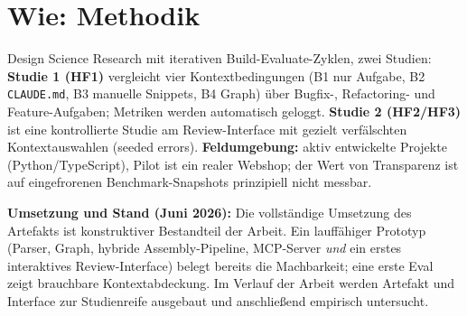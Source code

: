 \documentclass[11pt,a4paper]{scrartcl}
\newcommand{\code}[1]{\texttt{#1}}
\begin{document}
\section{Wie: Methodik}

Design Science Research mit iterativen Build-Evaluate-Zyklen, zwei Studien:
\textbf{Studie 1 (HF1)} vergleicht vier Kontextbedingungen (B1 nur Aufgabe, B2 \code{CLAUDE.md},
B3 manuelle Snippets, B4 Graph) über Bugfix-, Refactoring- und Feature-Aufgaben; Metriken werden
automatisch geloggt. \textbf{Studie 2 (HF2/HF3)} ist eine kontrollierte Studie am Review-Interface
mit gezielt verfälschten Kontextauswahlen (seeded errors). \textbf{Feldumgebung:} aktiv
entwickelte Projekte (Python/TypeScript), Pilot ist ein realer Webshop; der Wert von
Transparenz ist auf eingefrorenen Benchmark-Snapshots prinzipiell nicht messbar.

\textbf{Umsetzung und Stand (Juni 2026):} Die vollständige Umsetzung des Artefakts ist
konstruktiver Bestandteil der Arbeit. Ein lauffähiger Prototyp (Parser, Graph, hybride
Assembly-Pipeline, MCP-Server \emph{und} ein erstes interaktives Review-Interface) belegt
bereits die Machbarkeit; eine erste Eval zeigt brauchbare Kontextabdeckung. Im Verlauf der
Arbeit werden Artefakt und Interface zur Studienreife ausgebaut und anschließend empirisch
untersucht.
\end{document}
